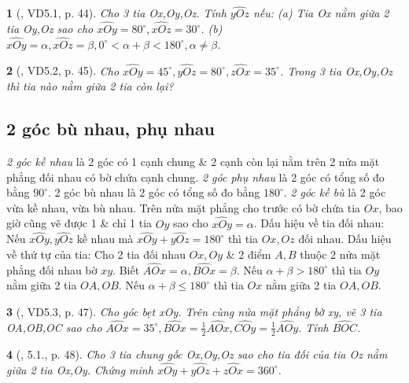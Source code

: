 \documentclass{article}
\newtheorem{baitoan}{}
\begin{document}
\begin{baitoan}[\cite{TLCT_THCS_Toan_6_hinh_hoc}, VD5.1, p. 44]
	Cho 3 tia Ox,Oy,Oz. Tính $\widehat{yOz}$ nếu: (a) Tia Ox nằm giữa 2 tia Oy,Oz sao cho $\widehat{xOy} = 80^\circ,\widehat{xOz} = 30^\circ$. (b) $\widehat{xOy} = \alpha,\widehat{xOz} = \beta,0^\circ < \alpha + \beta < 180^\circ,\alpha\ne\beta$.
\end{baitoan}

\begin{baitoan}[\cite{TLCT_THCS_Toan_6_hinh_hoc}, VD5.2, p. 45]
	Cho $\widehat{xOy} = 45^\circ,\widehat{yOz} = 80^\circ,\widehat{zOx} = 35^\circ$. Trong 3 tia Ox,Oy,Oz thì tia nào nằm giữa 2 tia còn lại?
\end{baitoan}

\subsection{2 góc bù nhau, phụ nhau}
 \textit{2 góc kề nhau} là 2 góc có 1 cạnh chung \& 2 cạnh còn lại nằm trên 2 nửa mặt phẳng đối nhau có bờ chứa cạnh chung.  \textit{2 góc phụ nhau} là 2 góc có tổng số đo bằng $90^\circ$. 2 góc bù nhau là 2 góc có tổng số đo bằng $180^\circ$.  \textit{2 góc kề bù} là 2 góc vừa kề nhau, vừa bù nhau.  Trên nửa mặt phẳng cho trước có bờ chứa tia $Ox$, bao giờ cũng vẽ được 1 \& chỉ 1 tia $Oy$ sao cho $\widehat{xOy} = \alpha$.  {\sf Dấu hiệu về tia đối nhau}: Nếu $\widehat{xOy},\widehat{yOz}$ kề nhau mà $\widehat{xOy} + \widehat{yOz} = 180^\circ$ thì tia $Ox,Oz$ đối nhau.  {\sf Dấu hiệu về thứ tự của tia}: Cho 2 tia đối nhau $Ox,Oy$ \& 2 điểm $A,B$ thuộc 2 nửa mặt phẳng đối nhau bờ $xy$. Biết $\widehat{AOx} = \alpha,\widehat{BOx} = \beta$. Nếu $\alpha + \beta > 180^\circ$ thì tia $Oy$ nằm giữa 2 tia $OA,OB$. Nếu $\alpha + \beta\le180^\circ$ thì tia $Ox$ nằm giữa 2 tia $OA,OB$.

\begin{baitoan}[\cite{TLCT_THCS_Toan_6_hinh_hoc}, VD5.3, p. 47]
	Cho góc bẹt xOy. Trên cùng nửa mặt phẳng bờ xy, vẽ 3 tia OA,OB,OC sao cho $\widehat{AOx} = 35^\circ,\widehat{BOx} = \frac{1}{2}\widehat{AOx},\widehat{COy} = \frac{1}{2}\widehat{AOy}$. Tính $\widehat{BOC}$.
\end{baitoan}

\begin{baitoan}[\cite{TLCT_THCS_Toan_6_hinh_hoc}, 5.1., p. 48]
	Cho 3 tia chung gốc Ox,Oy,Oz sao cho tia đối của tia Oz nằm giữa 2 tia Ox,Oy. Chứng minh $\widehat{xOy} + \widehat{yOz} + \widehat{zOx} = 360^\circ$.
\end{baitoan}
\end{document}

